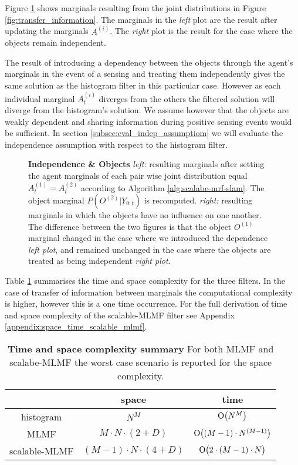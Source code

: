 \documentclass[review]{elsarticle}
\numberwithin{equation}{section}
\begin{document}
Figure \ref{fig:independence_object} shows marginals resulting from the joint distributions in Figure \ref{fig:transfer_information}. The marginals in
the \textit{left} plot are the result after updating the marginals $A^{(i)}$. The \textit{right} plot is the result for the case where the objects
remain independent. 

The result of introducing a dependency between the objects through the agent's marginals in the event of a sensing and treating them
independently gives the same solution as the histogram filter in this particular case. However as each individual marginal $A^{(i)}_t$ diverges 
from the others the filtered solution will diverge from the histogram's solution. We assume however that the objects are weakly dependent 
and sharing information during positive sensing events would be sufficient. In section \ref{subsec:eval_indep_assumptiom} we will 
evaluate the independence assumption with respect to the histogram filter.

\begin{figure}
  \centering
  \caption{\textbf{Independence \& Objects} \textit{left:} resulting marginals after setting the agent marginals of each pair wise joint distribution
  equal $A^{(1)}_t = A^{(2)}_t$ according to Algorithm \ref{alg:scalabe-mrf-slam}. The object marginal $P(O^{(2)}|Y_{0:t})$ is recomputed. 
  \textit{right:} resulting marginals in which the objects have no influence on one another. The difference
   between the two figures is that the object $O^{(1)}$ marginal changed in the case where we introduced the dependence \textit{left plot}, and remained 
  unchanged in the case where the objects are treated as being independent \textit{right plot}.}
  \label{fig:independence_object}
\end{figure}

Table \ref{tab:time_space_summary} summarises the time and space complexity for the three filters. In the case of transfer of
information between marginals the computational complexity is higher, however this is a one time occurrence. For the full derivation of
time and space complexity of the scalable-MLMF filter see Appendix \ref{appendix:space_time_scalable_mlmf}.

\begin{table}
 \centering
 \begin{tabular}{c|c|c|}
	         &    space   &     time \\ \hline
   histogram     &    $N^M$                                         &  $\operatorname{O}\bigl(N^M\bigr)$ \\ \hline
   MLMF          &    $M \cdot N \cdot \left(2 + D\right)$          &  $\operatorname{O}\bigl((M-1) \cdot N^{(M-1)}\bigr)$ \\ \hline
   scalable-MLMF &    $(M - 1) \cdot N \cdot \left(4 + D\right)$    &  $\operatorname{O}\bigl(2 \cdot (M-1) \cdot N\bigr)$ \\ \hline
   \end{tabular}
   \caption{\textbf{Time and space complexity summary} For both MLMF and scalabe-MLMF the worst case scenario is reported for the space complexity.}
   \label{tab:time_space_summary}
\end{table}
\end{document}
